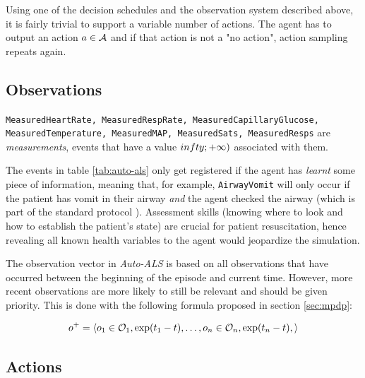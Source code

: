 Using one of the decision schedules and the observation system described above, it is fairly trivial to support a variable number of actions. 
The agent has to output an action $a \in \mathcal{A}$ and if that action is not a "no action", action sampling repeats again.

\newpage
\subsection{Observations}
\label{sec:auto-als-obs}

\texttt{MeasuredHeartRate, MeasuredRespRate, MeasuredCapillaryGlucose, MeasuredTemperature, MeasuredMAP, MeasuredSats, MeasuredResps} are \emph{measurements}, events that have a value $\-infty; +\infty)$ associated with them.

The events in table \ref{tab:auto-als} only get registered if the agent has \emph{learnt} some piece of information, meaning that, for example, \verb|AirwayVomit| will only occur if the patient has vomit in their airway \emph{and} the agent checked the airway (which is part of the standard protocol \cite{thimInitialAssessmentTreatment2012}).
Assessment skills (knowing where to look and how to establish the patient's state) are crucial for patient resuscitation, hence revealing all known health variables to the agent would jeopardize the simulation.

The observation vector in \emph{Auto-ALS} is based on all observations that have occurred between the beginning of the episode and current time.
However, more recent observations are more likely to still be relevant and should be given priority.
This is done with the following formula proposed in section \ref{sec:mpdp}:

\begin{equation}
     o^{+} = \langle o_1 \in \mathcal{O}_1, \exp(t_1-t), \dots, o_n \in \mathcal{O}_n, \exp(t_n-t), \rangle
\end{equation}

\newpage
\subsection{Actions}
\label{sec:auto-als-act}

